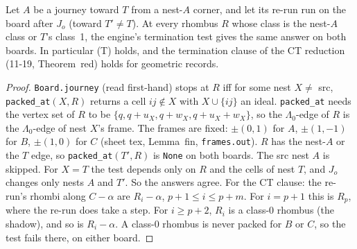 \documentclass[11pt]{article}
\theoremstyle{definition}\newtheorem{definition}[theorem]{Definition}\newtheorem{remark}[theorem]{Remark}
\begin{document}
\begin{lemma}\label{lem:term}
Let $A$ be a journey toward $T$ from a nest-$A$ corner, and let its re-run run on the board after $J_o$ (toward $T'\ne T$). At every rhombus $R$ whose class is the nest-$A$ class or $T$'s class~1, the engine's termination test gives the same answer on both boards. In particular (T) holds, and the termination clause of the CT reduction (11-19, Theorem~red) holds for geometric records.
\end{lemma}
\begin{proof}
\texttt{Board.journey} (read first-hand) stops at $R$ iff for some nest $X\ne$ src, \texttt{packed\_at}$(X,R)$ returns a cell $ij\notin X$ with $X\cup\{ij\}$ an ideal. \texttt{packed\_at} needs the vertex set of $R$ to be $\{q,q+u_X,q+w_X,q+u_X+w_X\}$, so the $\Lambda_0$-edge of $R$ is the $\Lambda_0$-edge of nest $X$'s frame. The frames are fixed: $\pm(0,1)$ for $A$, $\pm(1,-1)$ for $B$, $\pm(1,0)$ for $C$ (sheet tex, Lemma~fin, \texttt{frames.out}). $R$ has the nest-$A$ or the $T$ edge, so \texttt{packed\_at}$(T',R)$ is \texttt{None} on both boards. The src nest $A$ is skipped. For $X=T$ the test depends only on $R$ and the cells of nest $T$, and $J_o$ changes only nests $A$ and $T'$. So the answers agree.
For the CT clause: the re-run's rhombi along $C-\alpha$ are $R_i-\alpha$, $p+1\le i\le p+m$. For $i=p+1$ this is $R_p$, where the re-run does take a step. For $i\ge p+2$, $R_i$ is a class-0 rhombus (the shadow), and so is $R_i-\alpha$. A class-0 rhombus is never packed for $B$ or $C$, so the test fails there, on either board.
\end{proof}
\end{document}
